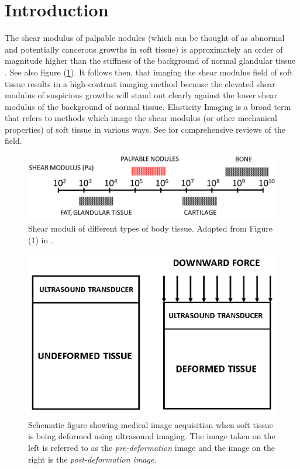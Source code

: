 \documentclass[12pt]{article}
\begin{document}
\section{Introduction}
The shear modulus of palpable nodules (which can be thought of as abnormal and potentially cancerous growths in soft tissue) is approximately an order of magnitude higher than the stiffness of the background of normal glandular tissue \cite{paper:sarv1998}. See also figure (\ref{fig:shearmod}). It follows then, that imaging the shear modulus field of soft tissue results in a high-contrast imaging method because the elevated shear modulus of suspicious growths will stand out clearly against the lower shear modulus of the background of normal tissue. Elasticity Imaging is a broad term that refers to methods which image the shear modulus (or other mechanical properties) of soft tissue in various ways. See \cite{paper:gao1996,paper:parker2010,book:alamgarra2019,bookchap:oberaibarbone2019} for comprehensive reviews of the field.
%
\begin{figure}[!h]
   \centering
    \includegraphics[totalheight=3cm]{Figures/shearmod_new.png}
  \caption{\label{fig:shearmod} Shear moduli of different types of body tissue. Adapted from Figure (1) in \cite{paper:sarv1998}.}
\end{figure}
%
\begin{figure}[!h]
   \centering
    \includegraphics[totalheight=5cm]{Figures/prepostnew.png}
  \caption{\label{fig:prepostimage} Schematic figure showing medical image acquisition when soft tissue is being deformed using ultrasound imaging. The image taken on the left is referred to as the \textit{pre-deformation} image and the image on the right is the \textit{post-deformation image}.}
\end{figure}
%
\end{document}
